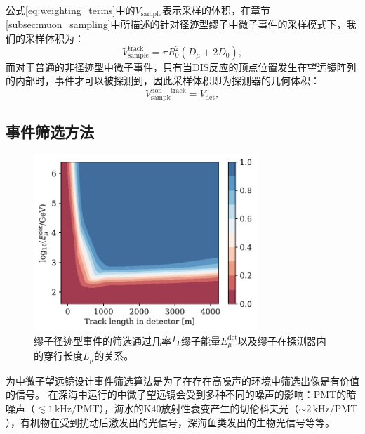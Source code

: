 公式\ref{eq:weighting_terms}中的$V_\mathrm{sample}$表示采样的体积，在章节\ref{subsec:muon_sampling}中所描述的针对径迹型缪子中微子事件的采样模式下，我们的采样体积为：
\begin{equation}
    V_\mathrm{sample}^\mathrm{track} = \pi R_0^2 (D_\mu + 2D_0) ,
    \label{eq:weighting_volume}
\end{equation}
而对于普通的非径迹型中微子事件，只有当DIS反应的顶点位置发生在望远镜阵列的内部时，事件才可以被探测到，因此采样体积即为探测器的几何体积：
\begin{equation}
    V_\mathrm{sample}^\mathrm{non-track} = V_\mathrm{det} ,
    \label{eq:weighting_volume_2}
\end{equation}

\subsection{事件筛选方法}

\begin{figure}[!htb]%
    \centering
    \includegraphics[width=0.75\textwidth]{img/trigger_rate_nn.pdf}
    \caption{缪子径迹型事件的筛选通过几率与缪子能量$E_\mu^\mathrm{det}$以及缪子在探测器内的穿行长度$L_\mu$的关系。}
    \label{fig:trigger_rate_nn}
\end{figure}

为中微子望远镜设计事件筛选算法是为了在存在高噪声的环境中筛选出像是有价值的信号\cite{KM3NeT_trigger:ICRC2019, IceCube_trigger:2015, KM3NeT_trigger:2018}。
在深海中运行的中微子望远镜会受到多种不同的噪声的影响：PMT的暗噪声（$\lesssim 1 \,\mathrm{kHz} / \mathrm{PMT}$），海水的K40放射性衰变产生的切伦科夫光（$\sim 2 \,\mathrm{kHz} / \mathrm{PMT}$）\cite{KM3NeT_K40:2017}，有机物在受到扰动后激发出的光信号，深海鱼类发出的生物光信号\cite{ANTARES_biolumi:2021, Baikal_biolumi:2021}等等。

